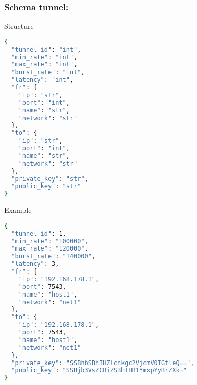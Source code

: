 \newpage
\subsubsection{Schema tunnel:}
\label{dsmf_tunnel}
\begin{codes}
\item[Structure] \begin{lstlisting}[language=bash]
{
  "tunnel_id": "int",
  "min_rate": "int",
  "max_rate": "int",
  "burst_rate": "int",
  "latency": "int",
  "fr": {
    "ip": "str",
    "port": "int",
    "name": "str",
    "network": "str"
  },
  "to": {
    "ip": "str",
    "port": "int",
    "name": "str",
    "network": "str"
  },
  "private_key": "str",
  "public_key": "str"
}
\end{lstlisting}
\end{codes}
\begin{codes}
\item[Example] \begin{lstlisting}[language=bash]
{
  "tunnel_id": 1,
  "min_rate": "100000",
  "max_rate": "120000",
  "burst_rate": "140000",
  "latency": 3,
  "fr": {
    "ip": "192.168.178.1",
    "port": 7543,
    "name": "host1",
    "network": "net1"
  },
  "to": {
    "ip": "192.168.178.1",
    "port": 7543,
    "name": "host1",
    "network": "net1"
  },
  "private_key": "SSBhbSBhIHZlcnkgc2VjcmV0IGtleQ==",
  "public_key": "SSBjb3VsZCBiZSBhIHB1YmxpYyBrZXk="
}
\end{lstlisting}
\end{codes}

\newpage
